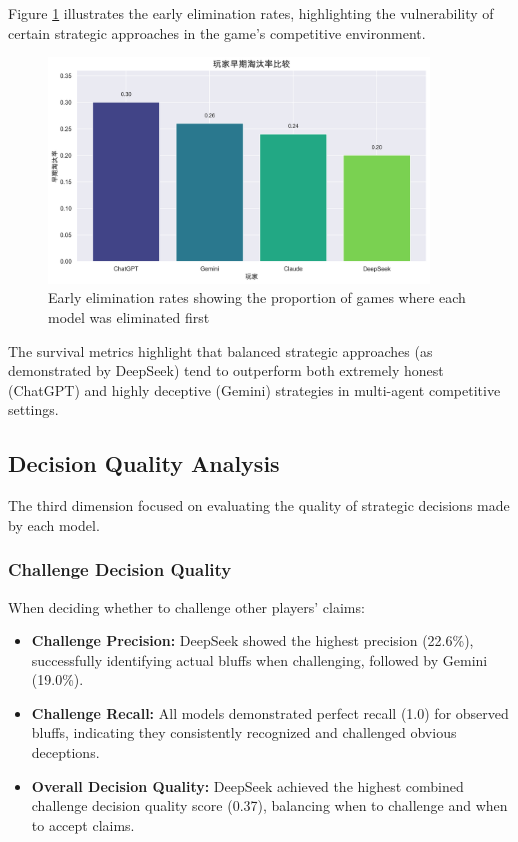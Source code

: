 \documentclass{article}
\begin{document}
Figure \ref{fig:early_elimination} illustrates the early elimination rates, highlighting the vulnerability of certain strategic approaches in the game's competitive environment.

\begin{figure}[H]
    \centering
    \includegraphics[width=0.9\textwidth]{figures/survival_early_elimination_rate.png}
    \caption{Early elimination rates showing the proportion of games where each model was eliminated first}
    \label{fig:early_elimination}
\end{figure}

The survival metrics highlight that balanced strategic approaches (as demonstrated by DeepSeek) tend to outperform both extremely honest (ChatGPT) and highly deceptive (Gemini) strategies in multi-agent competitive settings.

\subsection{Decision Quality Analysis}
The third dimension focused on evaluating the quality of strategic decisions made by each model.

\subsubsection{Challenge Decision Quality}
When deciding whether to challenge other players' claims:
\begin{itemize}
    \item \textbf{Challenge Precision:} DeepSeek showed the highest precision (22.6\%), successfully identifying actual bluffs when challenging, followed by Gemini (19.0\%).
    \item \textbf{Challenge Recall:} All models demonstrated perfect recall (1.0) for observed bluffs, indicating they consistently recognized and challenged obvious deceptions.
    \item \textbf{Overall Decision Quality:} DeepSeek achieved the highest combined challenge decision quality score (0.37), balancing when to challenge and when to accept claims.
\end{itemize}
\end{document}
